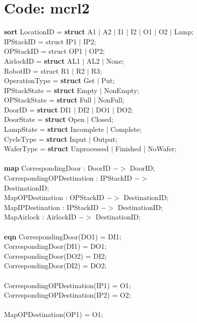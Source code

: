 \documentclass[a4paper,12pt]{article}
\begin{document}
	\section{Code: mcrl2}
	\textbf{sort} LocationID = \textbf{struct} A1 $|$ A2 $|$ I1 $|$ I2 $|$ O1 $|$ O2 $|$ Lamp;
	\\		 IPStackID = struct IP1 $|$ IP2;
	\\		OPStackID = struct OP1 $|$ OP2;
	\\		  AirlockID = \textbf{struct} AL1 $|$ AL2 $|$ None;
	\\          RobotID = struct R1 $|$ R2 $|$ R3;
	\\		  OperationType = \textbf{struct} Get $|$ Put;
	\\		  IPStackState = \textbf{struct} Empty $|$ NonEmpty;
	\\		  OPStackState = \textbf{struct} Full $|$ NonFull;
	\\	    DoorID = \textbf{struct} DI1 $|$ DI2 $|$ DO1 $|$ DO2;		
	\\		  DoorState = \textbf{struct} Open $|$ Closed;
	\\			LampState = \textbf{struct} Incomplete $|$ Complete;
	\\		  CycleType = \textbf{struct} Input $|$ Output;
	\\		  WaferType = \textbf{struct} Unprocessed $|$ Finished $|$ NoWafer;
	\\
	\\\textbf{map} CorrespondingDoor : DoorID $->$ DoorID;
	\\	  CorrespondingOPDestination : IPStackID $->$ \\DestinationID;		
	\\	  MapOPDestination : OPStackID $->$ DestinationID;
	\\		MapIPDestination : IPStackID $->$ DestinationID;
	\\		MapAirlock : AirlockID $->$ DestinationID;
	\\
	\\ \textbf{eqn} CorrespondingDoor(DO1) = DI1;
	\\		CorrespondingDoor(DI1) = DO1;
	\\		CorrespondingDoor(DO2) = DI2;
	\\		CorrespondingDoor(DI2) = DO2;
	\\
	\\		CorrespondingOPDestination(IP1) = O1;
	\\		CorrespondingOPDestination(IP2) = O2;
	\\
	\\		MapOPDestination(OP1) = O1;
\end{document}
